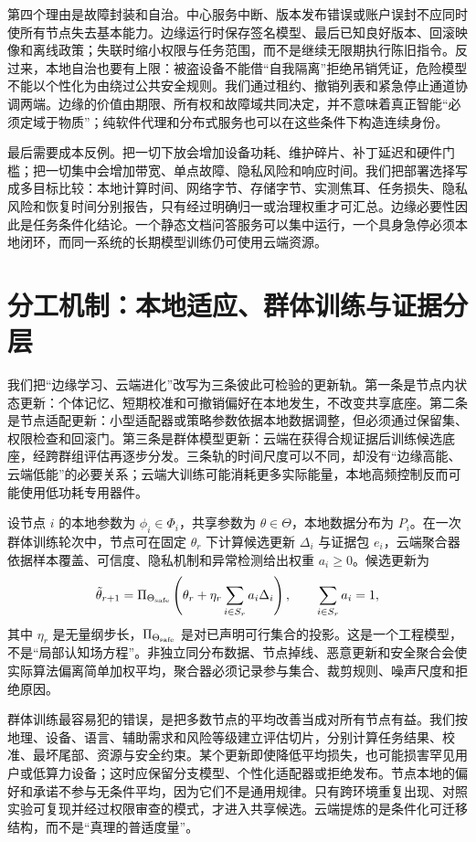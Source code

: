 第四个理由是故障封装和自治。中心服务中断、版本发布错误或账户误封不应同时使所有节点失去基本能力。边缘运行时保存签名模型、最后已知良好版本、回滚映像和离线政策；失联时缩小权限与任务范围，而不是继续无限期执行陈旧指令。反过来，本地自治也要有上限：被盗设备不能借“自我隔离”拒绝吊销凭证，危险模型不能以个性化为由绕过公共安全规则。我们通过租约、撤销列表和紧急停止通道协调两端。边缘的价值由期限、所有权和故障域共同决定，并不意味着真正智能“必须定域于物质”；纯软件代理和分布式服务也可以在这些条件下构造连续身份。

最后需要成本反例。把一切下放会增加设备功耗、维护碎片、补丁延迟和硬件门槛；把一切集中会增加带宽、单点故障、隐私风险和响应时间。我们把部署选择写成多目标比较：本地计算时间、网络字节、存储字节、实测焦耳、任务损失、隐私风险和恢复时间分别报告，只有经过明确归一或治理权重才可汇总。边缘必要性因此是任务条件化结论。一个静态文档问答服务可以集中运行，一个具身急停必须本地闭环，而同一系统的长期模型训练仍可使用云端资源。

\section{分工机制：本地适应、群体训练与证据分层}
\label{sec:division_of_labor}

我们把“边缘学习、云端进化”改写为三条彼此可检验的更新轨。第一条是节点内状态更新：个体记忆、短期校准和可撤销偏好在本地发生，不改变共享底座。第二条是节点适配更新：小型适配器或策略参数依据本地数据调整，但必须通过保留集、权限检查和回滚门。第三条是群体模型更新：云端在获得合规证据后训练候选底座，经跨群组评估再逐步分发。三条轨的时间尺度可以不同，却没有“边缘高能、云端低能”的必要关系；云端大训练可能消耗更多实际能量，本地高频控制反而可能使用低功耗专用器件。

设节点 $i$ 的本地参数为 $\phi_i\in\Phi_i$，共享参数为 $\theta\in\Theta$，本地数据分布为 $P_i$。在一次群体训练轮次中，节点可在固定 $\theta_r$ 下计算候选更新 $\Delta_i$ 与证据包 $e_i$，云端聚合器依据样本覆盖、可信度、隐私机制和异常检测给出权重 $a_i\geq0$。候选更新为
\begin{equation}
 \tilde\theta_{r+1}=\Pi_{\Theta_{\rm safe}}
 \left(\theta_r+\eta_r\sum_{i\in S_r}a_i\Delta_i\right),
 \qquad \sum_{i\in S_r}a_i=1,
\end{equation}
其中 $\eta_r$ 是无量纲步长，$\Pi_{\Theta_{\rm safe}}$ 是对已声明可行集合的投影。这是一个工程模型，不是“局部认知场方程”。非独立同分布数据、节点掉线、恶意更新和安全聚合会使实际算法偏离简单加权平均，聚合器必须记录参与集合、裁剪规则、噪声尺度和拒绝原因。

群体训练最容易犯的错误，是把多数节点的平均改善当成对所有节点有益。我们按地理、设备、语言、辅助需求和风险等级建立评估切片，分别计算任务结果、校准、最坏尾部、资源与安全约束。某个更新即使降低平均损失，也可能损害罕见用户或低算力设备；这时应保留分支模型、个性化适配器或拒绝发布。节点本地的偏好和承诺不参与无条件平均，因为它们不是通用规律。只有跨环境重复出现、对照实验可复现并经过权限审查的模式，才进入共享候选。云端提炼的是条件化可迁移结构，而不是“真理的普适度量”。

